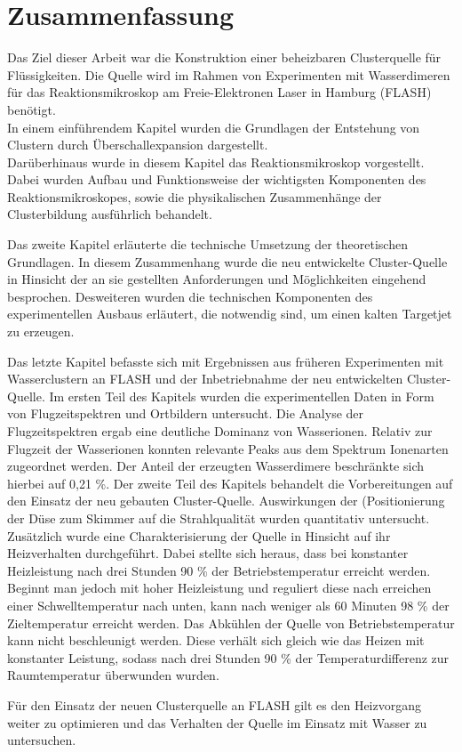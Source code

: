 \chapter{Zusammenfassung} 

Das Ziel dieser Arbeit war die Konstruktion einer beheizbaren Clusterquelle für Flüssigkeiten. Die Quelle wird im Rahmen von Experimenten mit Wasserdimeren für das Reaktionsmikroskop am Freie-Elektronen Laser in Hamburg (FLASH) benötigt. \\

In einem einführendem Kapitel wurden die Grundlagen der Entstehung von Clustern durch Überschallexpansion dargestellt. \\Darüberhinaus wurde in diesem Kapitel das Reaktionsmikroskop vorgestellt. Dabei wurden Aufbau und Funktionsweise der wichtigsten Komponenten des Reaktionsmikroskopes, sowie die physikalischen Zusammenhänge der Clusterbildung ausführlich behandelt.

Das zweite Kapitel erläuterte die technische Umsetzung der theoretischen Grundlagen. In diesem Zusammenhang wurde die neu entwickelte Cluster-Quelle in Hinsicht der an sie gestellten Anforderungen und Möglichkeiten eingehend besprochen. Desweiteren wurden die technischen Komponenten des experimentellen Ausbaus erläutert, die notwendig sind, um einen kalten Targetjet zu erzeugen.

Das letzte Kapitel befasste sich mit Ergebnissen aus früheren Experimenten mit Wasserclustern an FLASH und der Inbetriebnahme der neu entwickelten Cluster-Quelle.
Im ersten Teil des Kapitels wurden die experimentellen Daten in Form von Flugzeitspektren und Ortbildern untersucht. Die Analyse der Flugzeitspektren ergab eine deutliche Dominanz von Wasserionen. Relativ zur Flugzeit der Wasserionen konnten relevante Peaks aus dem Spektrum Ionenarten zugeordnet werden. Der Anteil der erzeugten Wasserdimere beschränkte sich hierbei auf 0,21 \%.
Der zweite Teil des Kapitels behandelt die Vorbereitungen auf den Einsatz der neu gebauten Cluster-Quelle. Auswirkungen der (Positionierung der Düse zum Skimmer auf die Strahlqualität wurden quantitativ untersucht. Zusätzlich wurde eine Charakterisierung der Quelle in Hinsicht auf ihr Heizverhalten durchgeführt. Dabei stellte sich heraus, dass bei konstanter Heizleistung nach drei Stunden 90 \% der Betriebstemperatur erreicht werden. Beginnt man jedoch mit hoher Heizleistung und reguliert diese nach erreichen einer Schwelltemperatur nach unten, kann nach weniger als 60 Minuten 98 \% der Zieltemperatur erreicht werden. Das Abkühlen der Quelle von Betriebstemperatur kann nicht beschleunigt werden. Diese verhält sich gleich wie das Heizen mit konstanter Leistung, sodass nach drei Stunden 90 \% der Temperaturdifferenz zur Raumtemperatur überwunden wurden. 

Für den Einsatz der neuen Clusterquelle an FLASH gilt es den Heizvorgang weiter zu optimieren und das Verhalten der Quelle im Einsatz mit Wasser zu untersuchen.

